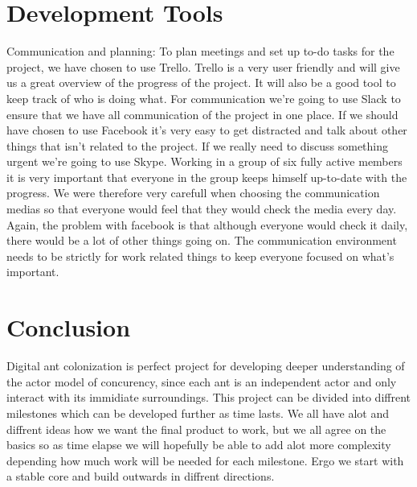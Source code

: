 \documentclass[a4paper]{article}
\begin{document}
\section{Development Tools}
Communication and planning: To plan meetings and set up to-do tasks for the
project, we have chosen to use Trello. Trello is a very user friendly and will
give us a great overview of the progress of the project. It will also be a good
tool to keep track of who is doing what. For communication we’re going to use
Slack to ensure that we have all communication of the project in one place. If
we should have chosen to use Facebook it’s very easy to get distracted and talk
about other things that isn’t related to the project. If we really need to discuss
something urgent we’re going to use Skype. Working in a group of six fully active members
it is very important that everyone in the group keeps himself up-to-date with the progress. 
We were therefore very carefull when choosing the communication medias so that everyone would
feel that they would check the media every day. Again, the problem with facebook is that 
although everyone would check it daily, there would be a lot of other things going on.
The communication environment needs to be strictly for work related things to keep everyone
focused on what's important. 


\section{Conclusion}
Digital ant colonization is perfect project for developing deeper understanding
of the actor model of concurency, since each ant is an independent actor and
only interact with its immidiate surroundings. This project can be divided into
diffrent milestones which can be developed further as time lasts. We all have
alot and diffrent ideas how we want the final product to work, but we all agree
on the basics so as time elapse we will hopefully be able to add alot more
complexity depending how much work will be needed for each milestone. Ergo we
start with a stable core and build outwards in diffrent directions.
\end{document}
